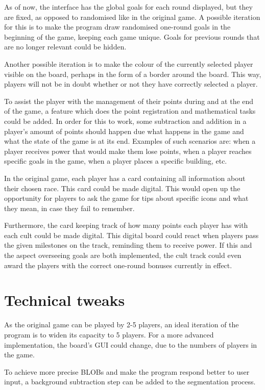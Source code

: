 As of now, the interface has the global goals for each round displayed, but they are fixed, as opposed to randomised like in the original game. A possible iteration for this is to make the program draw randomised one-round goals in the beginning of the game, keeping each game unique. Goals for previous rounds that are no longer relevant could be hidden.

Another possible iteration is to make the colour of the currently selected player visible on the board, perhaps in the form of a border around the board. This way, players will not be in doubt whether or not they have correctly selected a player.

To assist the player with the management of their points during and at the end of the game, a feature which does the point registration and mathematical tasks could be added. In order for this to work, some subtraction and addition in a player’s amount of points should happen due what happens in the game and what the state of the game is at its end. Examples of such scenarios are: when a player receives power that would make them lose points, when a player reaches specific goals in the game, when a player places a specific building, etc. 

In the original game, each player has a card containing all information about their chosen race. This card could be made digital. This would open up the opportunity for players to ask the game for tips about specific icons and what they mean, in case they fail to remember.

Furthermore, the card keeping track of how many points each player has with each cult could be made digital. This digital board could react when players pass the given milestones on the track, reminding them to receive power. If this and the aspect overseeing goals are both implemented, the cult track could even award the players with the correct one-round bonuses currently in effect.  

\section{Technical tweaks}
As the original game can be played by 2-5 players, an ideal iteration of the program is to widen its capacity to 5 players. For a more advanced implementation, the board's GUI could change, due to the numbers of players in the game.

To achieve more precise BLOBs and make the program respond better to user input, a background subtraction step can be added to the segmentation process.